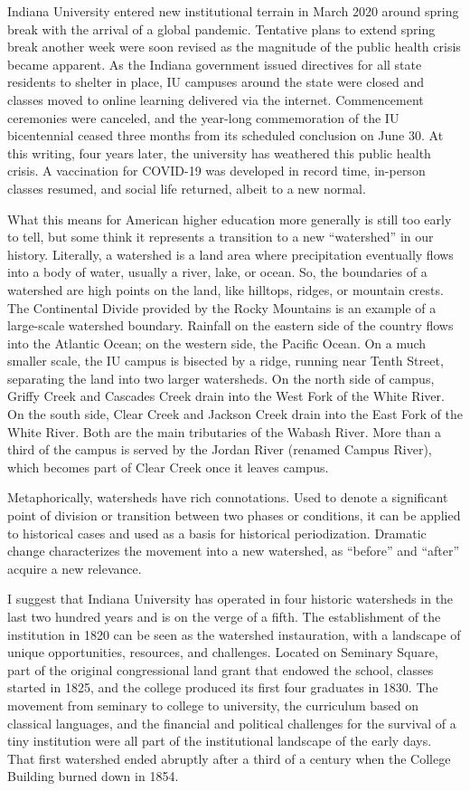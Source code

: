 \documentclass[
  american,
  letterpaper,
]{scrreprt}
\begin{document}
Indiana University entered new institutional terrain in March 2020
around spring break with the arrival of a global pandemic. Tentative
plans to extend spring break another week were soon revised as the
magnitude of the public health crisis became apparent. As the Indiana
government issued directives for all state residents to shelter in
place, IU campuses around the state were closed and classes moved to
online learning delivered via the internet. Commencement ceremonies were
canceled, and the year-long commemoration of the IU bicentennial ceased
three months from its scheduled conclusion on June 30. At this writing,
four years later, the university has weathered this public health
crisis. A vaccination for COVID-19 was developed in record time,
in-person classes resumed, and social life returned, albeit to a new
normal.

What this means for American higher education more generally is still
too early to tell, but some think it represents a transition to a new
``watershed'' in our history. Literally, a watershed is a land area
where precipitation eventually flows into a body of water, usually a
river, lake, or ocean. So, the boundaries of a watershed are high points
on the land, like hilltops, ridges, or mountain crests. The Continental
Divide provided by the Rocky Mountains is an example of a large-scale
watershed boundary. Rainfall on the eastern side of the country flows
into the Atlantic Ocean; on the western side, the Pacific Ocean. On a
much smaller scale, the IU campus is bisected by a ridge, running near
Tenth Street, separating the land into two larger watersheds. On the
north side of campus, Griffy Creek and Cascades Creek drain into the
West Fork of the White River. On the south side, Clear Creek and Jackson
Creek drain into the East Fork of the White River. Both are the main
tributaries of the Wabash River. More than a third of the campus is
served by the Jordan River (renamed Campus River), which becomes part of
Clear Creek once it leaves campus.

Metaphorically, watersheds have rich connotations. Used to denote a
significant point of division or transition between two phases or
conditions, it can be applied to historical cases and used as a basis
for historical periodization. Dramatic change characterizes the movement
into a new watershed, as ``before'' and ``after'' acquire a new
relevance.

I suggest that Indiana University has operated in four historic
watersheds in the last two hundred years and is on the verge of a fifth.
The establishment of the institution in 1820 can be seen as the
watershed instauration, with a landscape of unique opportunities,
resources, and challenges. Located on Seminary Square, part of the
original congressional land grant that endowed the school, classes
started in 1825, and the college produced its first four graduates in
1830. The movement from seminary to college to university, the
curriculum based on classical languages, and the financial and political
challenges for the survival of a tiny institution were all part of the
institutional landscape of the early days. That first watershed ended
abruptly after a third of a century when the College Building burned
down in 1854.
\end{document}
